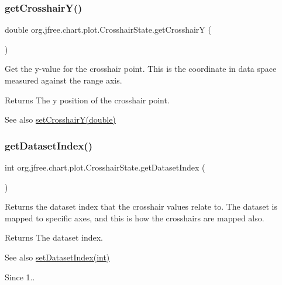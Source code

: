 \subsubsection{\texorpdfstring{get\+Crosshair\+Y()}{getCrosshairY()}}
{\footnotesize\ttfamily double org.\+jfree.\+chart.\+plot.\+Crosshair\+State.\+get\+CrosshairY (\begin{DoxyParamCaption}{ }\end{DoxyParamCaption})}

Get the y-\/value for the crosshair point. This is the coordinate in data space measured against the range axis.

\begin{DoxyReturn}{Returns}
The y position of the crosshair point.
\end{DoxyReturn}
\begin{DoxySeeAlso}{See also}
\mbox{\hyperlink{classorg_1_1jfree_1_1chart_1_1plot_1_1_crosshair_state_a477e48de63a6cbc6fb019c8f7537b26a}{set\+Crosshair\+Y(double)}} 
\end{DoxySeeAlso}
\mbox{\label{classorg_1_1jfree_1_1chart_1_1plot_1_1_crosshair_state_ab81dcb895b605a2fc1dde15aa3dc2538}} 
\subsubsection{\texorpdfstring{get\+Dataset\+Index()}{getDatasetIndex()}}
{\footnotesize\ttfamily int org.\+jfree.\+chart.\+plot.\+Crosshair\+State.\+get\+Dataset\+Index (\begin{DoxyParamCaption}{ }\end{DoxyParamCaption})}

Returns the dataset index that the crosshair values relate to. The dataset is mapped to specific axes, and this is how the crosshairs are mapped also.

\begin{DoxyReturn}{Returns}
The dataset index.
\end{DoxyReturn}
\begin{DoxySeeAlso}{See also}
\mbox{\hyperlink{classorg_1_1jfree_1_1chart_1_1plot_1_1_crosshair_state_af26dcaa885914e377a9e3493045c331d}{set\+Dataset\+Index(int)}}
\end{DoxySeeAlso}
\begin{DoxySince}{Since}
1.. 
\end{DoxySince}
\mbox{\label{classorg_1_1jfree_1_1chart_1_1plot_1_1_crosshair_state_a6e25ddb850af1b53b22b5f4a261a0d3a}} 
